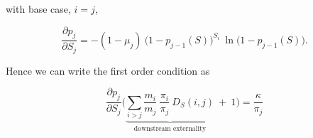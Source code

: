 \documentclass[american, abstract=on]{scrartcl}
\begin{document}
with base case, $i = j$,

\begin{equation}
  \frac{\partial p_j}{\partial S_j} = -(1 - \mu_j) \ \Big( 1 - p_{j-1}(S) \Big)^{S_i} \ \ln\Big(1 - p_{j-1}(S)\Big).
\end{equation}

Hence we can write the first order condition as

\begin{equation}
  \frac{\partial p_j}{\partial S_j} \Bigg( \underbrace{\sum_{i > j} \frac{m_i}{m_j} \ \frac{\pi_i}{\pi_j} \ D_S(i, j)}_{\text{downstream externality}} \ + \ 1 \Bigg) = \frac{\kappa}{\pi_j}
\end{equation}

\newpage
\nocite{*}
\printbibliography
\end{document}
